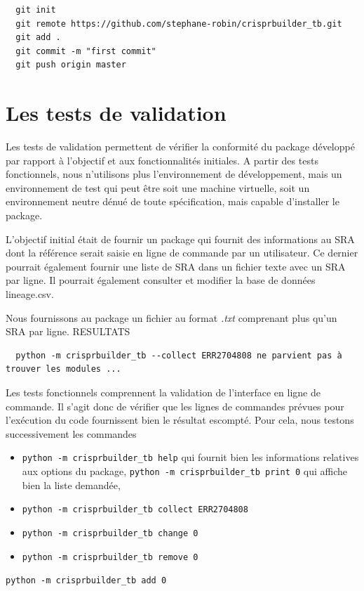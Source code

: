 \documentclass[twoside,a4paper,11pt,frenchb,openany]{report}
\begin{document}
\begin{verbatim}
  git init
  git remote https://github.com/stephane-robin/crisprbuilder_tb.git
  git add .
  git commit -m "first commit"
  git push origin master
\end{verbatim} 





\section{Les tests de validation}

Les tests de validation permettent de vérifier la conformité du package développé par rapport à l'objectif et aux fonctionnalités initiales. A partir des tests fonctionnels, nous n'utilisons plus l'environnement de développement, mais un environnement de test qui peut être soit une machine virtuelle, soit un environnement neutre dénué de toute spécification, mais capable d'installer le package.

L'objectif initial était de fournir un package qui fournit des informations au SRA dont la référence serait saisie en ligne de commande par un utilisateur. Ce dernier pourrait également fournir une liste de SRA dans un fichier texte avec un SRA par ligne. Il pourrait également consulter et modifier la base de données lineage.csv.

Nous fournissons au package un fichier au format \textit{.txt} comprenant plus qu'un SRA par ligne. RESULTATS  

\begin{verbatim}
  python -m crisprbuilder_tb --collect ERR2704808 ne parvient pas à trouver les modules ...
\end{verbatim}

Les tests fonctionnels comprennent la validation de l'interface en ligne de commande. Il s'agit donc de vérifier que les lignes de commandes prévues pour l'exécution du code fournissent bien le résultat escompté. Pour cela, nous testons successivement les commandes

\begin{itemize}
\item \texttt{python -m crisprbuilder\_tb \textemdash \textemdash help} qui fournit bien les informations relatives aux options du package,
\texttt{python -m crisprbuilder\_tb \textemdash \textemdash print 0} qui affiche bien la liste demandée,
\item \texttt{python -m crisprbuilder\_tb \textemdash \textemdash collect ERR2704808}
\item \texttt{python -m crisprbuilder\_tb \textemdash \textemdash change 0}
\item \texttt{python -m crisprbuilder\_tb \textemdash \textemdash remove 0}
\end{itemize}
\texttt{python -m crisprbuilder\_tb \textemdash \textemdash add 0}
\end{document}
